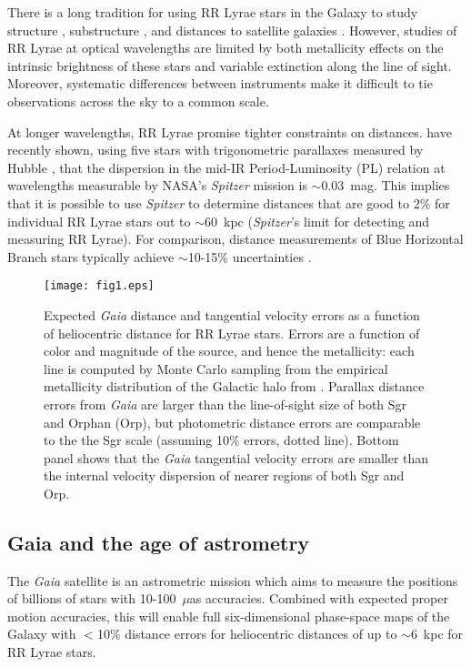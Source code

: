 \documentclass{emulateapj}
\begin{document}
There is a long tradition for using RR Lyrae stars in the Galaxy to
study structure 
\citep[e.g.][]{shapley18}, substructure
\citep[e.g.][]{sesar10}, and distances to satellite galaxies
\citep[e.g.][]{clementini03}.  However, studies of RR Lyrae at optical
wavelengths are limited by both metallicity effects on the intrinsic
brightness of these stars and variable extinction along the line of
sight.  Moreover, systematic differences between instruments make it
difficult to tie observations across the sky to a common scale. 

At longer wavelengths, RR Lyrae promise tighter constraints on
distances.  
\citet{madore12} have recently shown, 
using five stars with
trigonometric parallaxes measured by Hubble \citep{benedict11},
that the dispersion in the mid-IR Period-Luminosity (PL) relation 
\citep[first mapped by][]{longmore86}
at
wavelengths measurable by NASA's {\it Spitzer} mission is $\sim$0.03~mag.
This implies that it is
possible to use {\it Spitzer} to determine distances that are good to $2\%$ for 
individual RR Lyrae stars out to $\sim$60~kpc ({\it Spitzer}'s limit for detecting and measuring RR Lyrae).
For comparison, distance measurements of Blue Horizontal Branch
stars typically
achieve $\sim$10-15\% uncertainties  \citep[if appropriate color measurements are available, e.g.,][]{deason12b}.

\begin{figure}[h!]
\begin{center}
\texttt{[image: fig1.eps]}

\caption{Expected {\it Gaia} distance and tangential velocity errors as a function of heliocentric distance for RR Lyrae stars. Errors are a function of color and magnitude of the source, and hence the metallicity: each line is computed
by Monte Carlo sampling from the empirical metallicity distribution of
the Galactic halo from \cite{ivezic08}. Parallax distance errors from {\it Gaia} are larger than the line-of-sight size of both Sgr and Orphan (Orp), but photometric distance errors are comparable to the the Sgr scale (assuming 10\% errors, dotted line). Bottom panel shows that the {\it Gaia} tangential velocity errors are smaller than the internal velocity dispersion of nearer regions of both Sgr and Orp. }\label{fig:gaia_errors}
\end{center}
\end{figure}

\subsection{Gaia and the age of astrometry}
\label{sec:gaia}
The {\it Gaia} satellite \citep{gaia01} is
an astrometric mission which aims to measure the positions of billions
of stars with 10-100~$\mu$as accuracies. Combined with expected 
proper motion accuracies, this will enable full six-dimensional phase-space 
maps of the Galaxy with $<$10\% distance errors for heliocentric distances of
up to $\sim$6~kpc for RR Lyrae stars.
\end{document}
